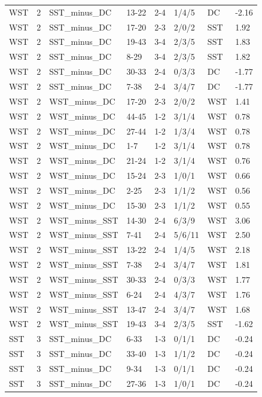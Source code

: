 \begin{table}[!h]
\begin{tabular}[t]{lrllllll}
WST & 2 & SST_minus_DC & 13-22 & 2-4 & 1/4/5 & DC & -2.16\\
\addlinespace
WST & 2 & SST_minus_DC & 17-20 & 2-3 & 2/0/2 & SST & 1.92\\
WST & 2 & SST_minus_DC & 19-43 & 3-4 & 2/3/5 & SST & 1.83\\
WST & 2 & SST_minus_DC & 8-29 & 3-4 & 2/3/5 & SST & 1.82\\
WST & 2 & SST_minus_DC & 30-33 & 2-4 & 0/3/3 & DC & -1.77\\
WST & 2 & SST_minus_DC & 7-38 & 2-4 & 3/4/7 & DC & -1.77\\
\addlinespace
WST & 2 & WST_minus_DC & 17-20 & 2-3 & 2/0/2 & WST & 1.41\\
WST & 2 & WST_minus_DC & 44-45 & 1-2 & 3/1/4 & WST & 0.78\\
WST & 2 & WST_minus_DC & 27-44 & 1-2 & 1/3/4 & WST & 0.78\\
WST & 2 & WST_minus_DC & 1-7 & 1-2 & 3/1/4 & WST & 0.78\\
WST & 2 & WST_minus_DC & 21-24 & 1-2 & 3/1/4 & WST & 0.76\\
\addlinespace
WST & 2 & WST_minus_DC & 15-24 & 2-3 & 1/0/1 & WST & 0.66\\
WST & 2 & WST_minus_DC & 2-25 & 2-3 & 1/1/2 & WST & 0.56\\
WST & 2 & WST_minus_DC & 15-30 & 2-3 & 1/1/2 & WST & 0.55\\
WST & 2 & WST_minus_SST & 14-30 & 2-4 & 6/3/9 & WST & 3.06\\
WST & 2 & WST_minus_SST & 7-41 & 2-4 & 5/6/11 & WST & 2.50\\
\addlinespace
WST & 2 & WST_minus_SST & 13-22 & 2-4 & 1/4/5 & WST & 2.18\\
WST & 2 & WST_minus_SST & 7-38 & 2-4 & 3/4/7 & WST & 1.81\\
WST & 2 & WST_minus_SST & 30-33 & 2-4 & 0/3/3 & WST & 1.77\\
WST & 2 & WST_minus_SST & 6-24 & 2-4 & 4/3/7 & WST & 1.76\\
WST & 2 & WST_minus_SST & 13-47 & 2-4 & 3/4/7 & WST & 1.68\\
\addlinespace
WST & 2 & WST_minus_SST & 19-43 & 3-4 & 2/3/5 & SST & -1.62\\
SST & 3 & SST_minus_DC & 6-33 & 1-3 & 0/1/1 & DC & -0.24\\
SST & 3 & SST_minus_DC & 33-40 & 1-3 & 1/1/2 & DC & -0.24\\
SST & 3 & SST_minus_DC & 9-34 & 1-3 & 0/1/1 & DC & -0.24\\
SST & 3 & SST_minus_DC & 27-36 & 1-3 & 1/0/1 & DC & -0.24\\

\end{tabular}
\end{table}
